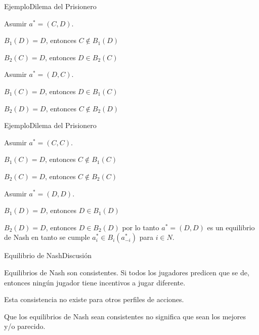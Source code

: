 \documentclass[notes, 11pt]{beamer} %
\newenvironment{wideitemize}{\itemize\addtolength{\itemsep}{10pt}}{\enditemize}
\begin{document}
\begin{frame}{Ejemplo}{Dilema del Prisionero}
	\begin{wideitemize}
		\item Asumir $a^{*} = (C,D)$.
		\begin{wideitemize}
			\item[--] $B_{1}(D) = D$, entonces $C \notin B_{1}(D)$
			\item[--] $B_{2}(C) = D$, entonces $D \in B_{2}(C)$
		\end{wideitemize}
		\item Asumir $a^{*} = (D,C)$.
		\begin{wideitemize}
			\item[--] $B_{1}(C) = D$, entonces $D \in B_{1}(C)$
			\item[--] $B_{2}(D) = D$, entonces $C \notin B_{2}(D)$
		\end{wideitemize}
	\end{wideitemize}
\end{frame}

\begin{frame}{Ejemplo}{Dilema del Prisionero}
	\begin{wideitemize}
		\item Asumir $a^{*} = (C,C)$.
		\begin{wideitemize}
			\item[--] $B_{1}(C) = D$, entonces $C \notin B_{1}(C)$
			\item[--] $B_{2}(C) = D$, entonces $C \notin B_{2}(C)$
		\end{wideitemize}
		\item Asumir $a^{*} = (D,D)$.
		\begin{wideitemize}
			\item[--] $B_{1}(D) = D$, entonces $D \in B_{1}(D)$
			\item[--] $B_{2}(D) = D$, entonces $D \in B_{2}(D)$
		\end{wideitemize} por lo tanto $a^{*} = (D,D)$ es un equilibrio de Nash en tanto se cumple $a_{i}^{*} \in B_{i}(a_{-i}^{*})$ para $i \in N$.
	\end{wideitemize}
\end{frame}

\begin{frame}{Equilibrio de Nash}{Discusi\'on}
\begin{wideitemize}
	\item<1-> Equilibrios de Nash son consistentes. Si todos los jugadores predicen que se de, entonces ning\'un jugador tiene incentivos a jugar diferente.
	\item<2-> Esta consistencia no existe para otros perfiles de acciones.
	\item<3-> Que los equilibrios de Nash sean consistentes no significa que sean los mejores y/o parecido.
\end{wideitemize}
\end{frame}
\end{document}
